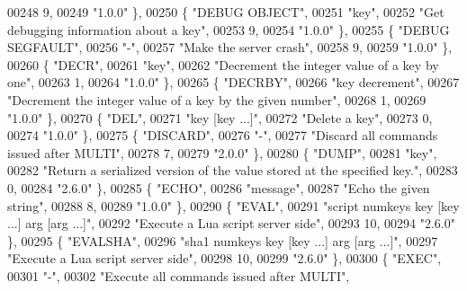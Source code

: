 \begin{DoxyCode}
00248     9,
00249     \textcolor{stringliteral}{"1.0.0"} \},
00250     \{ \textcolor{stringliteral}{"DEBUG OBJECT"},
00251     \textcolor{stringliteral}{"key"},
00252     \textcolor{stringliteral}{"Get debugging information about a key"},
00253     9,
00254     \textcolor{stringliteral}{"1.0.0"} \},
00255     \{ \textcolor{stringliteral}{"DEBUG SEGFAULT"},
00256     \textcolor{stringliteral}{"-"},
00257     \textcolor{stringliteral}{"Make the server crash"},
00258     9,
00259     \textcolor{stringliteral}{"1.0.0"} \},
00260     \{ \textcolor{stringliteral}{"DECR"},
00261     \textcolor{stringliteral}{"key"},
00262     \textcolor{stringliteral}{"Decrement the integer value of a key by one"},
00263     1,
00264     \textcolor{stringliteral}{"1.0.0"} \},
00265     \{ \textcolor{stringliteral}{"DECRBY"},
00266     \textcolor{stringliteral}{"key decrement"},
00267     \textcolor{stringliteral}{"Decrement the integer value of a key by the given number"},
00268     1,
00269     \textcolor{stringliteral}{"1.0.0"} \},
00270     \{ \textcolor{stringliteral}{"DEL"},
00271     \textcolor{stringliteral}{"key [key ...]"},
00272     \textcolor{stringliteral}{"Delete a key"},
00273     0,
00274     \textcolor{stringliteral}{"1.0.0"} \},
00275     \{ \textcolor{stringliteral}{"DISCARD"},
00276     \textcolor{stringliteral}{"-"},
00277     \textcolor{stringliteral}{"Discard all commands issued after MULTI"},
00278     7,
00279     \textcolor{stringliteral}{"2.0.0"} \},
00280     \{ \textcolor{stringliteral}{"DUMP"},
00281     \textcolor{stringliteral}{"key"},
00282     \textcolor{stringliteral}{"Return a serialized version of the value stored at the specified key."},
00283     0,
00284     \textcolor{stringliteral}{"2.6.0"} \},
00285     \{ \textcolor{stringliteral}{"ECHO"},
00286     \textcolor{stringliteral}{"message"},
00287     \textcolor{stringliteral}{"Echo the given string"},
00288     8,
00289     \textcolor{stringliteral}{"1.0.0"} \},
00290     \{ \textcolor{stringliteral}{"EVAL"},
00291     \textcolor{stringliteral}{"script numkeys key [key ...] arg [arg ...]"},
00292     \textcolor{stringliteral}{"Execute a Lua script server side"},
00293     10,
00294     \textcolor{stringliteral}{"2.6.0"} \},
00295     \{ \textcolor{stringliteral}{"EVALSHA"},
00296     \textcolor{stringliteral}{"sha1 numkeys key [key ...] arg [arg ...]"},
00297     \textcolor{stringliteral}{"Execute a Lua script server side"},
00298     10,
00299     \textcolor{stringliteral}{"2.6.0"} \},
00300     \{ \textcolor{stringliteral}{"EXEC"},
00301     \textcolor{stringliteral}{"-"},
00302     \textcolor{stringliteral}{"Execute all commands issued after MULTI"},

\end{DoxyCode}
